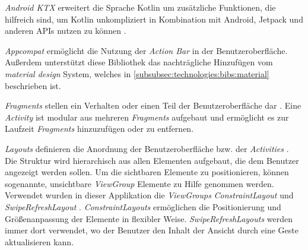 \documentclass[a4paper]{article}
\begin{document}
\textit{Android KTX} erweitert die Sprache Kotlin um zusätzliche Funktionen, die hilfreich sind, um Kotlin unkompliziert in Kombination mit Android, Jetpack und anderen APIs nutzen zu können \autocite{android_ktx}.

\textit{Appcompat} \autocite{android_appcompat} ermöglicht die Nutzung der \textit{Action Bar} \autocite{android_action_bar} in der Benutzeroberfläche. Außerdem unterstützt diese Bibliothek das nachträgliche Hinzufügen vom \textit{material design} System, welches in \autoref{subsubsec:technologies:bibs:material} beschrieben ist.

\textit{Fragments} stellen ein Verhalten oder einen Teil der Benutzeroberfläche dar \autocite{android_fragments}. Eine \textit{Activity} ist modular aus mehreren \textit{Fragments} aufgebaut und ermöglicht es zur Laufzeit \textit{Fragments} hinzuzufügen oder zu entfernen.

\textit{Layouts} definieren die Anordnung der Benutzeroberfläche bzw. der \textit{Activities} \autocite{android_layouts}. Die Struktur wird hierarchisch aus allen Elementen aufgebaut, die dem Benutzer angezeigt werden sollen. Um die sichtbaren Elemente zu positionieren, können sogenannte, unsichtbare \textit{ViewGroup} Elemente zu Hilfe genommen werden. Verwendet wurden in dieser Applikation die \textit{ViewGroups} \textit{ConstraintLayout} \autocite{android_constraintlayout} und \textit{SwipeRefreshLayout} \autocite{android_swiperefreshlayout}. \textit{ConstraintLayouts} ermöglichen die Positionierung und Größenanpassung der Elemente in flexibler Weise. \textit{SwipeRefreshLayouts} werden immer dort verwendet, wo der Benutzer den Inhalt der Ansicht durch eine Geste aktualisieren kann.
\end{document}
